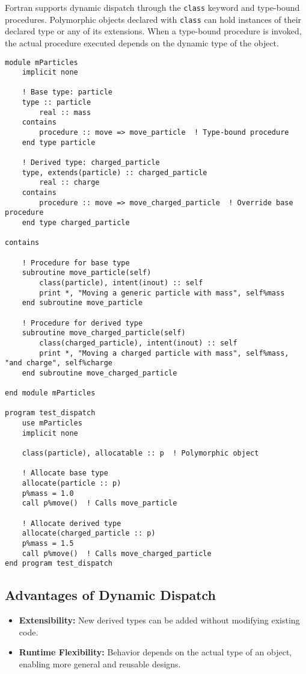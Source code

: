 Fortran supports dynamic dispatch through the \texttt{class} keyword and type-bound procedures. Polymorphic objects declared with \texttt{class} can hold instances of their declared type or any of its extensions. When a type-bound procedure is invoked, the actual procedure executed depends on the dynamic type of the object.

\begin{lstlisting}[caption={Example of Dynamic Dispatch in Fortran}, label={lst:dynamic_dispatch}]
module mParticles
    implicit none

    ! Base type: particle
    type :: particle
        real :: mass
    contains
        procedure :: move => move_particle  ! Type-bound procedure
    end type particle

    ! Derived type: charged_particle
    type, extends(particle) :: charged_particle
        real :: charge
    contains
        procedure :: move => move_charged_particle  ! Override base procedure
    end type charged_particle

contains

    ! Procedure for base type
    subroutine move_particle(self)
        class(particle), intent(inout) :: self
        print *, "Moving a generic particle with mass", self%mass
    end subroutine move_particle

    ! Procedure for derived type
    subroutine move_charged_particle(self)
        class(charged_particle), intent(inout) :: self
        print *, "Moving a charged particle with mass", self%mass, "and charge", self%charge
    end subroutine move_charged_particle

end module mParticles

program test_dispatch
    use mParticles
    implicit none

    class(particle), allocatable :: p  ! Polymorphic object

    ! Allocate base type
    allocate(particle :: p)
    p%mass = 1.0
    call p%move()  ! Calls move_particle

    ! Allocate derived type
    allocate(charged_particle :: p)
    p%mass = 1.5
    call p%move()  ! Calls move_charged_particle
end program test_dispatch
\end{lstlisting}

\subsection{Advantages of Dynamic Dispatch}
\begin{itemize}
    \item \textbf{Extensibility:} New derived types can be added without modifying existing code.
    \item \textbf{Runtime Flexibility:} Behavior depends on the actual type of an object, enabling more general and reusable designs.
\end{itemize}

